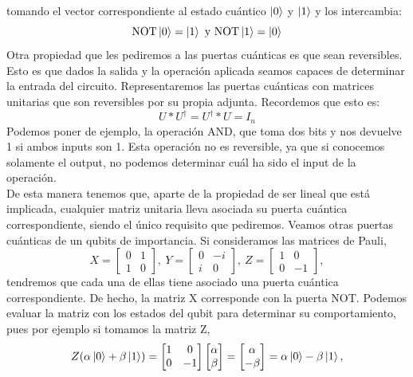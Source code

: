 \documentclass[a4paper]{article}
\numberwithin{equation}{section}
\begin{document}
tomando el vector correspondiente al estado cuántico $\ket{0}$ y $\ket{1}$ y los intercambia:
\begin{equation}
\textrm{NOT} \ket{0} = \ket{1} \textrm{ y } \textrm{NOT}\ket{1} = \ket{0}
\end{equation}
Otra propiedad que les pediremos a las puertas cuánticas es que sean reversibles. Esto es que dados la salida y la operación aplicada seamos capaces de determinar la entrada del circuito. Representaremos las puertas cuánticas con matrices unitarias que son reversibles por su propia adjunta. Recordemos que esto es:
\begin{equation}
U * U^\dagger = U^\dagger * U = I_n
\end{equation}
Podemos poner de ejemplo, la operación AND, que toma dos bits y nos devuelve 1 si ambos inputs son 1. Esta operación no es reversible, ya que si conocemos solamente el output, no podemos determinar cuál ha sido el input de la operación. \\
De esta manera tenemos que, aparte de la propiedad de ser lineal que está implicada, cualquier matriz unitaria lleva asociada su puerta cuántica correspondiente, siendo el único requisito que pediremos.
Veamos otras puertas cuánticas de un qubits de importancia. Si consideramos las matrices de Pauli,
\begin{equation}
X = \begin{bmatrix}
	0 & 1 \\
	1 & 0
\end{bmatrix}, \ 
Y = \begin{bmatrix}
	0 & -i \\
	i & 0
\end{bmatrix}, \ 
Z = \begin{bmatrix}
	1 & 0 \\
	0 & -1
\end{bmatrix},
\end{equation}
tendremos que cada una de ellas tiene asociado una puerta cuántica correspondiente. De hecho, la matriz X corresponde con la puerta NOT. Podemos evaluar la matriz con los estados del qubit para determinar su comportamiento, pues por ejemplo si tomamos la matriz Z,
\begin{equation}
Z(\alpha\ket{0} + \beta\ket{1}) = 
\begin{bmatrix}
	1 & 0 \\
	0 & -1 
\end{bmatrix}
\begin{bmatrix}
	\alpha \\ \beta
\end{bmatrix} =
\begin{bmatrix}
	\alpha \\ -\beta
\end{bmatrix} =
\alpha\ket{0} - \beta\ket{1},
\end{equation}
\end{document}
